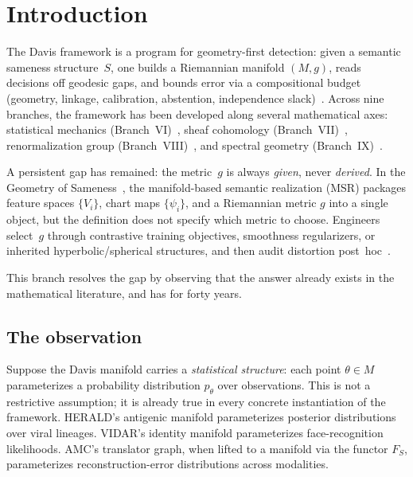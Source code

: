 \documentclass[11pt]{article}
\theoremstyle{remark}
\begin{document}
\section{Introduction}\label{sec:introduction}

The Davis framework is a program for geometry-first detection: given a semantic
sameness structure~$S$, one builds a Riemannian manifold $(M, g)$, reads
decisions off geodesic gaps, and bounds error via a compositional budget
(geometry, linkage, calibration, abstention, independence
slack)~\cite{davis2025manifold, davis2025sameness}.  Across nine branches, the
framework has been developed along several mathematical axes: statistical
mechanics (Branch~VI)~\cite{davis2025statmech}, sheaf cohomology
(Branch~VII)~\cite{davis2025sheaf}, renormalization group
(Branch~VIII)~\cite{davis2025rg}, and spectral geometry
(Branch~IX)~\cite{davis2025spectral}.

A persistent gap has remained: the metric~$g$ is always \emph{given}, never
\emph{derived}.  In the Geometry of Sameness~\cite{davis2025sameness}, the
manifold-based semantic realization (MSR) packages feature spaces $\{V_i\}$,
chart maps $\{\psi_i\}$, and a Riemannian metric $g$ into a single object, but
the definition does not specify which metric to choose.  Engineers select~$g$
through contrastive training objectives, smoothness regularizers, or inherited
hyperbolic/spherical structures, and then audit distortion
post~hoc~\cite{davis2025manifold}.

This branch resolves the gap by observing that the answer already exists in
the mathematical literature, and has for forty years.

\subsection{The observation}

Suppose the Davis manifold carries a \emph{statistical structure}: each point
$\theta \in M$ parameterizes a probability distribution $p_\theta$ over
observations.  This is not a restrictive assumption; it is already true in
every concrete instantiation of the framework.  HERALD's antigenic manifold
parameterizes posterior distributions over viral lineages.  VIDAR's identity
manifold parameterizes face-recognition likelihoods.  AMC's translator graph,
when lifted to a manifold via the functor $F_S$, parameterizes
reconstruction-error distributions across modalities.
\end{document}
